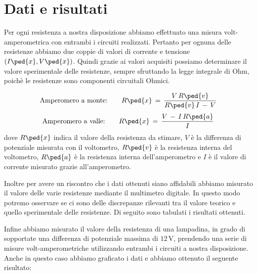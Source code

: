 \section*{Dati e risultati}

Per ogni resistenza a nostra disposizione abbiamo effettuato una misura volt-amperometrica con entrambi i circuiti realizzati. Pertanto per ognuna delle resistenze abbiamo due coppie di valori di corrente e tensione $(I\ped{x}, V\ped{x})$.
Quindi grazie ai valori acquisiti possiamo determinare il valore sperimentale delle resistenze, sempre sfruttando la legge integrale di Ohm, poichè le resistenze sono componenti circuitali Ohmici.

\begin{equation}
	\text{Amperomero a monte:} \qquad R\ped{x} \,=\, \frac{V\,R\ped{v}}{R\ped{v}\,I\,-\,V}
\end{equation}
\begin{equation}
	\text{Amperomero a valle:} \qquad R\ped{x} \,=\, \frac{V\,-\,I\,R\ped{a}}{I}
\end{equation}
%
dove $R\ped{x}$ indica il valore della resistenza da stimare, $V$ è la differenza di potenziale misurata con il voltometro, $R\ped{v}$ è la resistenza interna del voltometro, $R\ped{a}$ è la resistenza interna dell'amperometro e $I$ è il valore di corrente misurato grazie all'amperometro.

Inoltre per avere un riscontro che i dati ottenuti siano affidabili abbiamo misurato il valore delle varie resistenze mediante il multimetro digitale. In questo modo potremo osservare se ci sono delle discrepanze rilevanti tra il valore teorico e quello sperimentale delle resistenze. Di seguito sono tabulati i risultati ottenuti.



Infine abbiamo misurato il valore della resistenza di una lampadina, in grado di sopportate una differenza di potenziale massima di $12\,\si{\volt}$, prendendo una serie di misure volt-amperometriche utilizzando entrambi i circuiti a nostra disposizione.
Anche in questo caso abbiamo graficato i dati e abbiamo ottenuto il seguente risultato:

